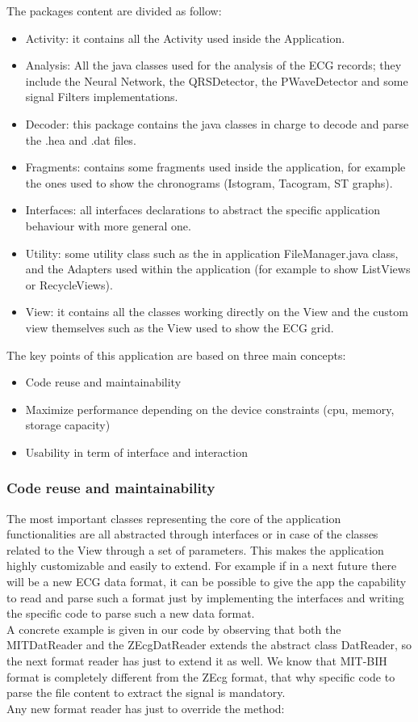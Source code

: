 The packages content are divided as follow:
\begin{itemize}
	\item Activity: it contains all the Activity used inside the Application.
    \item Analysis: All the java classes used for the analysis of the ECG records; they include the Neural Network, the QRSDetector, the PWaveDetector and some signal Filters implementations.
	\item Decoder:  this package contains the java classes in charge to decode and parse the .hea and .dat files.
	\item Fragments: contains some fragments used inside the application, for example  the ones used to show the chronograms (Istogram, Tacogram, ST graphs).
	\item Interfaces: all interfaces declarations to abstract the specific application behaviour with more general one.
	\item Utility: some utility class such as the in application FileManager.java class, and the Adapters used within the application (for example to show ListViews or RecycleViews).
	\item View: it contains all the classes working directly on the View and the custom view themselves such as the View used to show the ECG grid.
\end{itemize}
The key points of this application are based on three main concepts:
\begin{itemize}
	\item Code reuse and maintainability
	\item Maximize performance depending on the device constraints (cpu, memory, storage capacity)
	\item Usability in term of interface and interaction
\end{itemize}
\subsubsection{Code reuse and maintainability}
The most important classes representing the core of the application functionalities are all abstracted through interfaces or in case of the classes related to the View through a set of parameters. This makes the application highly customizable and easily to extend. For example if in a next future there will be a new ECG data format, it can be possible to give the app the capability to read and parse such a format just by implementing the interfaces and writing the specific code to parse such a new data format.\\
A concrete example is given in our code by observing that both the MITDatReader and the ZEcgDatReader extends the abstract class DatReader, so the next format reader has just to extend it as well. We know that MIT-BIH format is completely different from the ZEcg format, that why specific code to parse the file content to extract the signal is mandatory.\\
Any new format reader has just to override the method:

